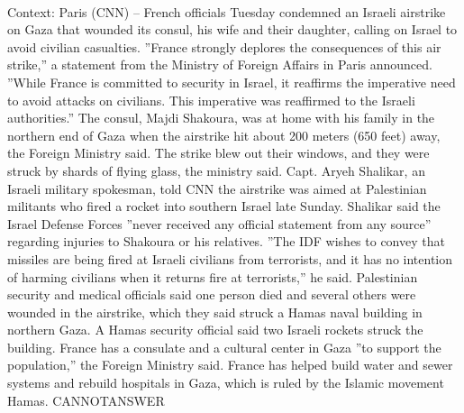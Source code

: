 \documentclass[11pt,a4paper, onecolumn]{article}
\begin{document}
\\ Context: Paris (CNN) -- French officials Tuesday condemned an Israeli airstrike on Gaza that wounded its consul, his wife and their daughter, calling on Israel to avoid civilian casualties. ''France strongly deplores the consequences of this air strike,'' a statement from the Ministry of Foreign Affairs in Paris announced. ''While France is committed to security in Israel, it reaffirms the imperative need to avoid attacks on civilians. This imperative was reaffirmed to the Israeli authorities.'' The consul, Majdi Shakoura, was at home with his family in the northern end of Gaza when the airstrike hit about 200 meters (650 feet) away, the Foreign Ministry said. The strike blew out their windows, and they were struck by shards of flying glass, the ministry said. Capt. Aryeh Shalikar, an Israeli military spokesman, told CNN the airstrike was aimed at Palestinian militants who fired a rocket into southern Israel late Sunday. Shalikar said the Israel Defense Forces ''never received any official statement from any source'' regarding injuries to Shakoura or his relatives. ''The IDF wishes to convey that missiles are being fired at Israeli civilians from terrorists, and it has no intention of harming civilians when it returns fire at terrorists,'' he said. Palestinian security and medical officials said one person died and several others were wounded in the airstrike, which they said struck a Hamas naval building in northern Gaza. A Hamas security official said two Israeli rockets struck the building. France has a consulate and a cultural center in Gaza ''to support the population,'' the Foreign Ministry said. France has helped build water and sewer systems and rebuild hospitals in Gaza, which is ruled by the Islamic movement Hamas. CANNOTANSWER
\end{document}
